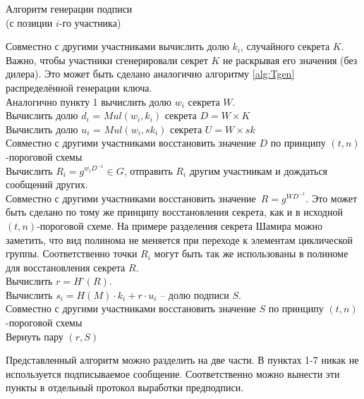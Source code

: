 \documentclass[a4paper,12pt]{article}
\theoremstyle{definition}
\begin{document}
		\begin{algorithm}
			\caption{Алгоритм генерации подписи \\ (с позиции $i$-го участника)}
			\label{alg:Tsign}
			
			
			\setlength{\parskip}{0.4\baselineskip}
			
			Совместно с другими участниками вычислить долю $k_i$, случайного секрета $K$. Важно, чтобы участники сгенерировали секрет $K$ не раскрывая его значения (без дилера). \linebreak
			Это может быть сделано аналогично алгоритму \ref{alg:Tgen} распределённой генерации ключа. 
			\\Аналогично пункту 1 вычислить долю $w_i$ секрета $W$.
			\\Вычислить долю $d_i$ = $Mul(w_i, k_i)$ секрета $D=W\times K$
			\\Вычислить долю $u_i$ = $Mul(w_i, sk_i)$ секрета $U=W\times sk$
			\\Совместно с другими участниками восстановить значение $D$ по принципу $(t, n)$-пороговой схемы
			\\Вычислить $R_i=g^{w_i D^{-1}}\in G$, отправить $R_i$ другим участникам и дождаться сообщений других.
			\\Совместно с другими участниками восстановить значение~$R=g^{W D^{-1}}$. 
			Это может быть сделано по тому же принципу восстановления секрета, как и в исходной $(t, n)$-пороговой схеме. На примере разделения секрета Шамира можно заметить, что вид полинома не меняется при переходе к элементам циклической группы. Соответственно точки $R_i$ могут быть так же использованы в полиноме для восстановления секрета $R$.
			\\Вычислить $r = H’(R)$.
			\\Вычислить $s_i = H(M) \cdot k_i + r \cdot u_i$  \--- долю подписи $S$.
			\\Совместно с другими участниками восстановить значение $S$ по принципу $(t, n)$-пороговой схемы
			\\Вернуть пару $(r, S)$
			
		\end{algorithm}
		
		Представленный алгоритм можно разделить на две части. В пунктах 1-7 никак не используется подписываемое сообщение. Соответственно можно вынести эти пункты в отдельный протокол выработки предподписи.
		
\end{document}

